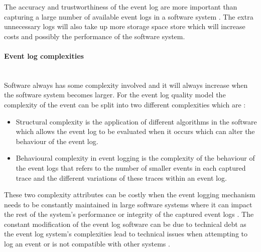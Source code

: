 The accuracy and trustworthiness of the event log are more important than capturing a large number of available event logs in a software system \cite{Zhu2015, Jans2012}. The extra unnecessary logs will also take up more storage space store which will increase costs and possibly the performance of the software system. 

\paragraph{Event log complexities}\leavevmode\\
Software always has some complexity involved and it will always increase when the software system becomes larger. For the event log quality model the complexity of the event can be split into two different complexities which are \cite{Kherbouche2017}:

\begin{itemize}
	\item Structural complexity is the application of different algorithms in the software which allows the event log to be evaluated when it occurs which can alter the behaviour of the event log.
	\item Behavioural complexity in event logging is the complexity of the behaviour of the event logs that refers to the number of smaller events in each captured trace and the different variations of these traces within an event log.
\end{itemize}

These two complexity attributes can be costly when the event logging mechanism needs to be constantly maintained in large software systems where it can impact the rest of the system's performance or integrity of the captured event logs \cite{Ogheneovo2014}. The constant modification of the event log software can be due to technical debt as the event log system's complexities lead to technical issues when attempting to log an event or is not compatible with other systems \cite{DeLeon-Sigg2020}.  

